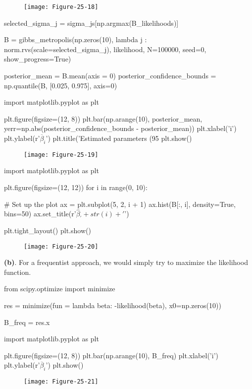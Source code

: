 \begin{figure}[H]
\centering
\texttt{[image: Figure-25-18]}
\end{figure}

\begin{python}
selected_sigma_{j} = sigma_{j}s[np.argmax(B_likelihoods)]

B = gibbs_metropolis(np.zeros(10), lambda j : norm.rvs(scale=selected_sigma_{j}), likelihood, N=100000, seed=0, 
                     show_progress=True)
\end{python}

\begin{python}
posterior_mean = B.mean(axis = 0)
posterior_confidence_bounds = np.quantile(B, [0.025, 0.975], axis=0)
\end{python}

\begin{python}
import matplotlib.pyplot as plt

plt.figure(figsize=(12, 8))
plt.bar(np.arange(10), posterior_mean, yerr=np.abs(posterior_confidence_bounds - posterior_mean))
plt.xlabel('i')
plt.ylabel(r'$\overline{\beta}_{i}$')
plt.title('Estimated parameters (95%
plt.show()
\end{python}

\begin{figure}[H]
\centering
\texttt{[image: Figure-25-19]}
\end{figure}

\begin{python}
import matplotlib.pyplot as plt

plt.figure(figsize=(12, 12))
for i in range(0, 10):
    
    # Set up the plot
    ax = plt.subplot(5, 2, i + 1)
    ax.hist(B[:, i], density=True, bins=50)
    ax.set_title(r'$\hat{\beta}_' + str(i) + '$')

plt.tight_layout()
plt.show()
\end{python}

\begin{figure}[H]
\centering
\texttt{[image: Figure-25-20]}
\end{figure}

\textbf{(b)}. For a frequentist approach, we would simply try to
maximize the likelihood function.

\begin{python}
from scipy.optimize import minimize

res = minimize(fun = lambda beta: -likelihood(beta), x0=np.zeros(10))
\end{python}

\begin{python}
B_freq = res.x

import matplotlib.pyplot as plt

plt.figure(figsize=(12, 8))
plt.bar(np.arange(10), B_freq)
plt.xlabel('i')
plt.ylabel(r'$\overline{\beta}_{i}$')
plt.show()
\end{python}

\begin{figure}[H]
\centering
\texttt{[image: Figure-25-21]}
\end{figure}

